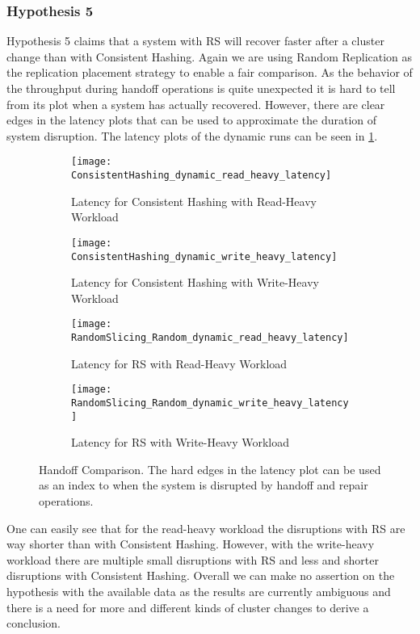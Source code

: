 \subsubsection{Hypothesis 5}
Hypothesis 5 claims that a system with \ac{RS} will recover faster after a cluster change than with Consistent Hashing.
Again we are using Random Replication as the replication placement strategy to enable a fair comparison.
As the behavior of the throughput during handoff operations is quite unexpected it is hard to tell from its plot when a system has actually recovered.
However, there are clear edges in the latency plots that can be used to approximate the duration of system disruption.
The latency plots of the dynamic runs can be seen in \cref{fig:handoff_comparison}.
\begin{figure}
\begin{subfigure}{0.5\textwidth}
	\texttt{[image: ConsistentHashing\_dynamic\_read\_heavy\_latency]}
	\caption[Latency for Consistent Hashing with Read-Heavy Workload]{Latency for Consistent Hashing with Read-Heavy Workload}
\end{subfigure}
\begin{subfigure}{0.5\textwidth}
	\texttt{[image: ConsistentHashing\_dynamic\_write\_heavy\_latency]}
	\caption[Latency for Consistent Hashing with Write-Heavy Workload]{Latency for Consistent Hashing with Write-Heavy Workload}
\end{subfigure}
\begin{subfigure}{0.5\textwidth}
	\texttt{[image: RandomSlicing\_Random\_dynamic\_read\_heavy\_latency]}
	\caption[Latency for \ac{RS} with Read-Heavy Workload]{Latency for \ac{RS} with Read-Heavy Workload}
\end{subfigure}
\begin{subfigure}{0.5\textwidth}
	\texttt{[image: RandomSlicing\_Random\_dynamic\_write\_heavy\_latency]}
	\caption[Latency for \ac{RS} with Write-Heavy Workload]{Latency for \ac{RS} with Write-Heavy Workload}
\end{subfigure}
\caption[Handoff Comparison]{Handoff Comparison. The hard edges in the latency plot can be used as an index to when the system is disrupted by handoff and repair operations.}
\label{fig:handoff_comparison}
\end{figure}
One can easily see that for the read-heavy workload the disruptions with \ac{RS} are way shorter than with Consistent Hashing.
However, with the write-heavy workload there are multiple small disruptions with \ac{RS} and less and shorter disruptions with Consistent Hashing.
Overall we can make no assertion on the hypothesis with the available data as the results are currently ambiguous and there is a need for more and different kinds of cluster changes to derive a conclusion.